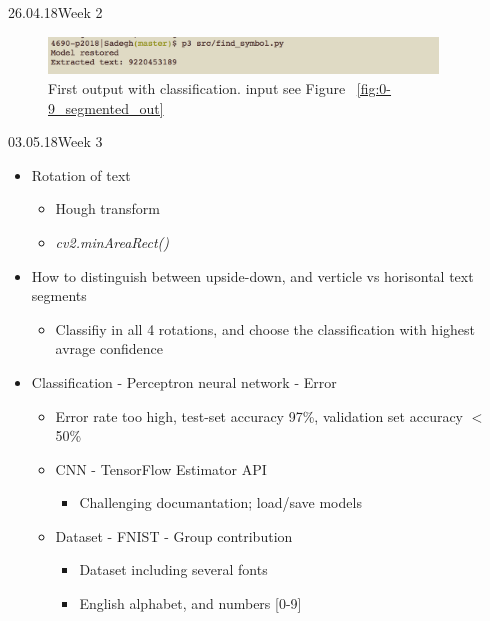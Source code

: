 \documentclass[11pt,a4paper,UKenglish]{article}
\begin{document}
\begin{loggentry}{26.04.18}{Week 2}
\begin{itemize}
\begin{itemize}
\begin{itemize}
        \begin{figure}[H]
          \centering
          \includegraphics[height=1cm]{res/classification_first_print.png}
          \caption{First output with classification. input see Figure ~\ref{fig:0-9_segmented_out}}
          \label{fig:classification_first_print}
        \end{figure}

      \end{itemize}
    \end{itemize}
\end{itemize}
\end{loggentry}


\newpage
\begin{loggentry}{03.05.18}{Week 3}
\begin{itemize}
  \item{Rotation of text}
  \begin{itemize}
    \item{Hough transform}
    \item{\textit{cv2.minAreaRect()}}
  \end{itemize}
  \item{How to distinguish between upside-down, and verticle vs horisontal text segments}
  \begin{itemize}
    \item{Classifiy in all 4 rotations, and choose the classification with highest avrage confidence}
  \end{itemize}
  \item{Classification - Perceptron neural network - Error}
  \begin{itemize}
    \item{Error rate too high, test-set accuracy 97\%, validation set accuracy $<$ 50\%}
    \item{CNN - TensorFlow Estimator API}
    \begin{itemize}
      \item{Challenging documantation; load/save models}
    \end{itemize}
    \item{Dataset - FNIST - Group contribution}
    \begin{itemize}
      \item{Dataset including several fonts}
      \item{English alphabet, and numbers [0-9]}
    \end{itemize}
  \end{itemize}
\end{itemize}
\end{loggentry}
\end{document}
